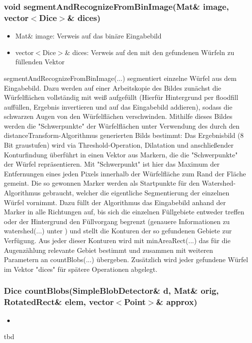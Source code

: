 \documentclass{../Vorlage/sebDenCls}
\begin{document}
\subsubsection{void segmentAndRecognizeFromBinImage(Mat\& image, vector$<$Dice$>$\& dices)}
\begin{itemize}
	\item Mat\& image: Verweis auf das binäre Eingabebild
	\item vector$<$Dice$>$\& dices: Verweis auf den mit den gefundenen Würfeln zu füllenden Vektor
\end{itemize}
segmentAndRecognizeFromBinImage(...) segmentiert einzelne Würfel aus dem Eingabebild. Dazu werden auf einer Arbeitskopie des Bildes zunächst die Würfelflächen vollständig mit weiß aufgefüllt (Hierfür Hintergrund per floodfill auffüllen, Ergebnis invertieren und auf das Eingabebild addieren), sodass die schwarzen Augen von den Würfelflächen verschwinden. Mithilfe dieses Bildes werden die "Schwerpunkte" der Würfelflächen unter Verwendung des durch den distanceTransform-Algorithmus generierten Bilds bestimmt: Das Ergebnisbild (8 Bit graustufen) wird via Threshold-Operation, Dilatation und anschließender Konturfindung überführt in einen Vektor aus Markern, die die "Schwerpunkte" der Würfel repräsentieren. Mit "Schwerpunkt" ist hier das Maximum der Entfernungen eines jeden Pixels innerhalb der Würfelfläche zum Rand der Fläche gemeint. \newline
Die so gewonnen Marker werden als Startpunkte für den Watershed-Algorithmus gebraucht, welcher die eigentliche Segmentierung der einzelnen Würfel vornimmt. Dazu füllt der Algorithmus das Eingabebild anhand der Marker in alle Richtungen auf, bis sich die einzelnen Füllgebiete entweder treffen oder der Hintergrund den Füllvorgang begrenzt (genauere Informationen zu watershed(...) unter \cite{opCV15}) und stellt die Konturen der so gefundenen Gebiete zur Verfügung. Aus jeder dieser Konturen wird mit minAreaRect(...) das für die Augenzählung relevante Gebiet bestimmt und zusammen mit weiteren Parametern an countBlobs(...) übergeben. Zusätzlich wird jeder gefundene Würfel im Vektor "dices" für spätere Operationen abgelegt.

\subsubsection{Dice countBlobs(SimpleBlobDetector\& d, Mat\& orig, RotatedRect\& elem, vector$<$Point$>$\& approx)}
\begin{itemize}
	\item 
\end{itemize}
tbd
\end{document}

